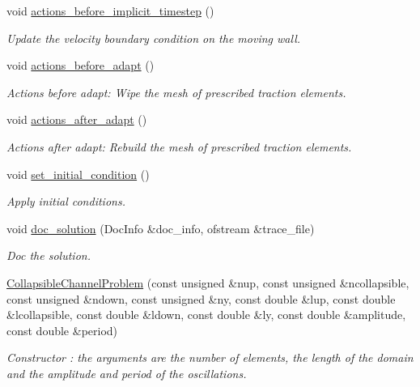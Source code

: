 \begin{DoxyCompactItemize}
void \hyperlink{classCollapsibleChannelProblem_a4c365050b11c184007b8e1cd6079147f}{actions\+\_\+before\+\_\+implicit\+\_\+timestep} ()
\begin{DoxyCompactList}\small\item\em Update the velocity boundary condition on the moving wall. \end{DoxyCompactList}\item 
void \hyperlink{classCollapsibleChannelProblem_a54abc5259d590154e5dfa458d885c16c}{actions\+\_\+before\+\_\+adapt} ()
\begin{DoxyCompactList}\small\item\em Actions before adapt\+: Wipe the mesh of prescribed traction elements. \end{DoxyCompactList}\item 
void \hyperlink{classCollapsibleChannelProblem_a3ea01d83f0256c588a652741c6c33e0e}{actions\+\_\+after\+\_\+adapt} ()
\begin{DoxyCompactList}\small\item\em Actions after adapt\+: Rebuild the mesh of prescribed traction elements. \end{DoxyCompactList}\item 
void \hyperlink{classCollapsibleChannelProblem_a646147fb75669cfcc5bb56ee79d9b8da}{set\+\_\+initial\+\_\+condition} ()
\begin{DoxyCompactList}\small\item\em Apply initial conditions. \end{DoxyCompactList}\item 
void \hyperlink{classCollapsibleChannelProblem_afc4af9796c01d904d4074bd5bbfc5b9b}{doc\+\_\+solution} (Doc\+Info \&doc\+\_\+info, ofstream \&trace\+\_\+file)
\begin{DoxyCompactList}\small\item\em Doc the solution. \end{DoxyCompactList}\item 
\hyperlink{classCollapsibleChannelProblem_ab43fa30667f57e8019c8b30fd93156f8}{Collapsible\+Channel\+Problem} (const unsigned \&nup, const unsigned \&ncollapsible, const unsigned \&ndown, const unsigned \&ny, const double \&lup, const double \&lcollapsible, const double \&ldown, const double \&ly, const double \&amplitude, const double \&period)
\begin{DoxyCompactList}\small\item\em Constructor \+: the arguments are the number of elements, the length of the domain and the amplitude and period of the oscillations. \end{DoxyCompactList}\item 

\end{DoxyCompactItemize}
